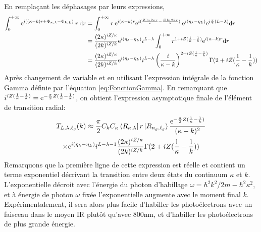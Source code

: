 En remplaçant les déphasages par leurs expressions,
\begin{align}
\int_{0}^{+ \infty} \mathrm{e}^{i((\kappa - k) r + \Phi_{\kappa,\lambda} - \Phi_{k,L})} \: r \: \mathrm{d} r & = \int_{0}^{+ \infty} r \: \mathrm{e}^{i(\kappa-k)r} \mathrm{e}^{i(\frac{Z \ln 2 \kappa r}{\kappa } - \frac{Z \ln 2 k r}{k})} \: \mathrm{e}^{i(\eta_\lambda - \eta_L)} \mathrm{e}^{i\frac{\pi}{2}(L - \lambda)} \mathrm{d} r \\
& = \frac{(2\kappa)^{iZ/\kappa}}{(2k)^{iZ/k}} \mathrm{e}^{i(\eta_\lambda - \eta_L)} i^{L-\lambda} \int_{0}^{+ \infty} r^{1+iZ(\frac{1}{\kappa}-\frac{1}{k})} \mathrm{e}^{i(\kappa-k)r} \mathrm{d} r \\
& = \frac{(2\kappa)^{iZ/\kappa}}{(2k)^{iZ/k}} \mathrm{e}^{i(\eta_\lambda - \eta_L)} i^{L-\lambda} \left( \frac{i}{\kappa-k} \right)^{2+iZ(\frac{1}{\kappa}-\frac{1}{k})} \Gamma(2+iZ(\frac{1}{\kappa}-\frac{1}{k}))
\end{align}
Après changement de variable et en utilisant l'expression intégrale de la fonction Gamma définie par l'équation \ref{eq:FonctionGamma}. En remarquant que $i^{iZ(\frac{1}{\kappa}-\frac{1}{k})} = \mathrm{e}^{-\frac{\pi}{2}Z(\frac{1}{\kappa}-\frac{1}{k})}$, on obtient l'expression asymptotique finale de l'élément de transition radial:
\begin{multline}
T_{L,\lambda,\ell_g}(k) \approx \frac{\pi}{2} C_k C_\kappa \bra{R_{\kappa,\lambda}} r \ket{R_{n_g,\ell_g}} \frac{\mathrm{e}^{-\frac{\pi}{2}Z(\frac{1}{\kappa}-\frac{1}{k})}}{(\kappa - k)^2} \\ \times \mathrm{e}^{i(\eta_\lambda - \eta_L)} i^{L-\lambda -1} \frac{(2\kappa)^{iZ/\kappa}}{(2k)^{iZ/k}} \Gamma(2+iZ(\frac{1}{\kappa}-\frac{1}{k}))
\end{multline}
Remarquons que la première ligne de cette expression est réelle et contient un terme exponentiel décrivant la transition entre deux états du continuum $\kappa$ et $k$. L'exponentielle décroit avec l'énergie du photon d'habillage $\omega = \hbar^2 k^2 / 2m - \hbar^2 \kappa^2$, et à énergie de photon $\omega$ fixée l'exponentielle augmente avec le moment final $k$. Expérimentalement, il sera alors plus facile d'habiller les photoélectrons avec un faisceau dans le moyen IR plutôt qu'avec 800nm, et d'habiller les photoélectrons de plus grande énergie.

